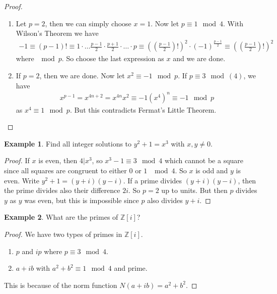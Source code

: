 \documentclass[a4paper]{book}
\theoremstyle{definition}
\newtheorem{example}{Example}[definition]
\begin{document}
\begin{proof}
    \begin{enumerate}
        \item Let \(p = 2\), then we can simply choose \(x = 1\). Now let \(p \equiv 1 \mod{4}\). With Wilson's Theorem we have
        \begin{align*}
            -1 \equiv (p - 1)! \equiv 1 \cdot \ldots \frac{p - 1}{2} \cdot \frac{p + 1}{2} \cdot \ldots \cdot p \equiv \left(\left(\frac{p - 1}{2}\right)!\right)^2 \cdot (-1)^{\frac{p - 1}{2}} \equiv \left(\left(\frac{p - 1}{2}\right)!\right)^2
        \end{align*}
        where \(\mod{p}\). So choose the last expression as \(x\) and we are done.
        \item If \(p = 2\), then we are done. Now let \(x^2 \equiv -1 \mod{p}\). If \(p \equiv 3 \mod(4)\), we have
        \begin{align*}
            x^{p - 1} = x^{4n + 2} = x^{4n} x^2 \equiv -1 (x^4)^n \equiv -1 \mod{p}
        \end{align*}
        as \(x^4 \equiv 1 \mod{p}\). But this contradicts Fermat's Little Theorem.
    \end{enumerate}
\end{proof}
\begin{example}
    Find all integer solutions to \(y^2 + 1 = x^3\) with \(x, y \neq 0\).
\end{example}
\begin{proof}
    If \(x\) is even, then \(4 | x^3\), so \(x^3 - 1 \equiv 3 \mod 4\) which cannot be a square since all squares are congruent to either \(0\) or \(1\) \(\mod{4}\). So \(x\) is odd and \(y\) is even. Write \(y^2 + 1 = (y + i)(y - i)\). If a prime divides \((y + i)(y - i)\), then the prime divides also their difference \(2i\). So \(p = 2\) up to units. But then \(p\) divides \(y\) as \(y\) was even, but this is impossible since \(p\) also divides \(y + i\).
\end{proof}

\begin{example}
    What are the primes of \(\mathbb{Z}[i]\)?
\end{example}
\begin{proof}
    We have two types of primes in \(\mathbb{Z}[i]\).
    \begin{enumerate}
        \item \(p\) and \(ip\) where \(p \equiv 3 \mod{4}\).
        \item \(a + i b\) with \(a^2 + b^2 \equiv 1 \mod{4}\) and prime.
    \end{enumerate}
    This is because of the norm function \(N(a + ib) = a^2 + b^2\).
\end{proof}
\end{document}
